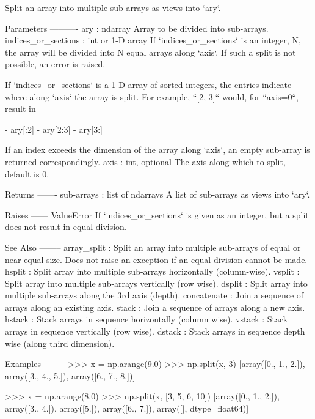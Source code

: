\begin{DoxyVerb}Split an array into multiple sub-arrays as views into `ary`.

Parameters
----------
ary : ndarray
    Array to be divided into sub-arrays.
indices_or_sections : int or 1-D array
    If `indices_or_sections` is an integer, N, the array will be divided
    into N equal arrays along `axis`.  If such a split is not possible,
    an error is raised.

    If `indices_or_sections` is a 1-D array of sorted integers, the entries
    indicate where along `axis` the array is split.  For example,
    ``[2, 3]`` would, for ``axis=0``, result in

      - ary[:2]
      - ary[2:3]
      - ary[3:]

    If an index exceeds the dimension of the array along `axis`,
    an empty sub-array is returned correspondingly.
axis : int, optional
    The axis along which to split, default is 0.

Returns
-------
sub-arrays : list of ndarrays
    A list of sub-arrays as views into `ary`.

Raises
------
ValueError
    If `indices_or_sections` is given as an integer, but
    a split does not result in equal division.

See Also
--------
array_split : Split an array into multiple sub-arrays of equal or
              near-equal size.  Does not raise an exception if
              an equal division cannot be made.
hsplit : Split array into multiple sub-arrays horizontally (column-wise).
vsplit : Split array into multiple sub-arrays vertically (row wise).
dsplit : Split array into multiple sub-arrays along the 3rd axis (depth).
concatenate : Join a sequence of arrays along an existing axis.
stack : Join a sequence of arrays along a new axis.
hstack : Stack arrays in sequence horizontally (column wise).
vstack : Stack arrays in sequence vertically (row wise).
dstack : Stack arrays in sequence depth wise (along third dimension).

Examples
--------
>>> x = np.arange(9.0)
>>> np.split(x, 3)
[array([0.,  1.,  2.]), array([3.,  4.,  5.]), array([6.,  7.,  8.])]

>>> x = np.arange(8.0)
>>> np.split(x, [3, 5, 6, 10])
[array([0.,  1.,  2.]),
 array([3.,  4.]),
 array([5.]),
 array([6.,  7.]),
 array([], dtype=float64)]\end{DoxyVerb}
 \mbox{\label{namespacenumpy_1_1lib_1_1shape__base_ac830db13ae6ed5702e2650b263dd479a}} 
